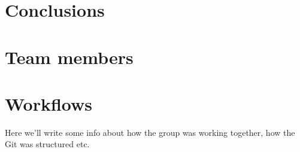 \documentclass{report}
\begin{document}
\chapter*{Conclusions}



\appendix
\chapter{Team members}


\chapter{Workflows}
Here we'll write some info about how the group was working together, how the Git was structured etc. 

 
\end{document}
